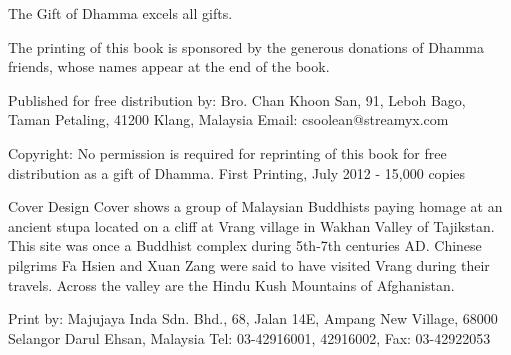 The Gift of Dhamma excels all gifts.

The printing of this book is sponsored by the generous donations of Dhamma friends, whose names appear at the end of the book.

Published for free distribution by:
Bro. Chan Khoon San,
91, Leboh Bago, Taman Petaling,
41200 Klang, Malaysia
Email: csoolean@streamyx.com

Copyright: No permission is required for reprinting of this book for free distribution as a gift of Dhamma.
First Printing, July 2012 - 15,000 copies

Cover Design
Cover shows a group of Malaysian Buddhists paying homage at an ancient stupa located on a cliff at Vrang village in Wakhan Valley of Tajikstan. This site was once a Buddhist complex during 5th-7th centuries AD. Chinese pilgrims Fa Hsien and Xuan Zang were said to have visited Vrang during their travels. Across the valley are the Hindu Kush Mountains of Afghanistan.

Print by: Majujaya Inda Sdn. Bhd.,
68, Jalan 14E, Ampang New Village,
68000 Selangor Darul Ehsan, Malaysia
Tel: 03-42916001, 42916002, Fax: 03-42922053

